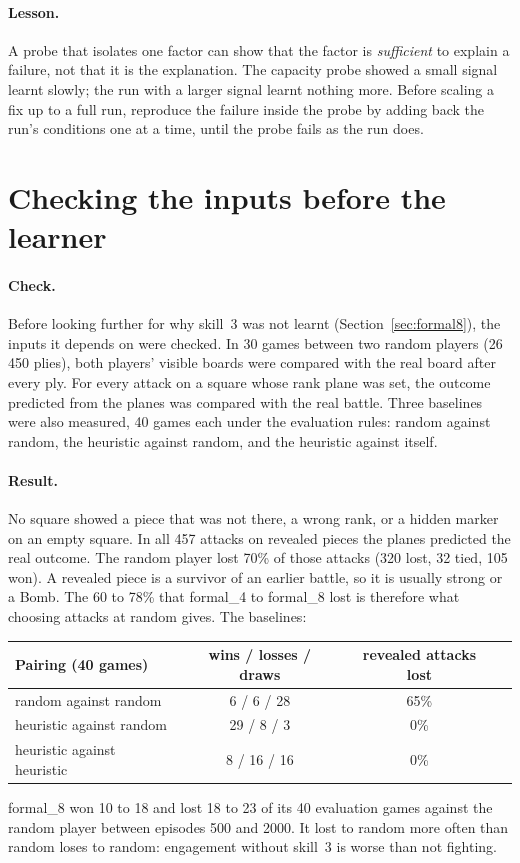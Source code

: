 \paragraph{Lesson.} A probe that isolates one factor can show that the factor is \emph{sufficient}
to explain a failure, not that it is the explanation. The capacity probe showed a small signal
learnt slowly; the run with a larger signal learnt nothing more. Before scaling a fix up to a full
run, reproduce the failure inside the probe by adding back the run's conditions one at a time,
until the probe fails as the run does.

\section{Checking the inputs before the learner}
\label{sec:inputs-check}

\paragraph{Check.} Before looking further for why skill~3 was not learnt
(Section~\ref{sec:formal8}), the inputs it depends on were checked. In 30 games between two
random players (26\,450 plies), both players' visible boards were compared with the real board
after every ply. For every attack on a square whose rank plane was set, the outcome predicted
from the planes was compared with the real battle. Three baselines were also measured, 40 games
each under the evaluation rules: random against random, the heuristic against random, and the
heuristic against itself.

\paragraph{Result.} No square showed a piece that was not there, a wrong rank, or a hidden marker
on an empty square. In all 457 attacks on revealed pieces the planes predicted the real outcome. The
random player lost 70\% of those attacks (320 lost, 32 tied, 105 won). A revealed piece is a
survivor of an earlier battle, so it is usually strong or a Bomb. The 60 to 78\% that formal\_4 to
formal\_8 lost is therefore what choosing attacks at random gives. The baselines:
\begin{center}
\small
\begin{tabular}{lccc}
\toprule
Pairing (40 games) & wins / losses / draws & revealed attacks lost \\
\midrule
random against random & 6 / 6 / 28 & 65\% \\
heuristic against random & 29 / 8 / 3 & 0\% \\
heuristic against heuristic & 8 / 16 / 16 & 0\% \\
\bottomrule
\end{tabular}
\end{center}
formal\_8 won 10 to 18 and lost 18 to 23 of its 40 evaluation games against the random player
between episodes 500 and 2000. It lost to random more often than random loses to random:
engagement without skill~3 is worse than not fighting.

